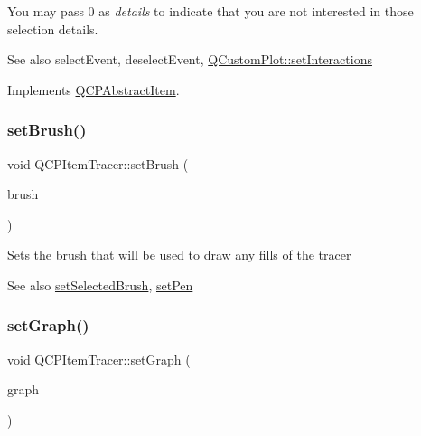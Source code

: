 You may pass 0 as {\itshape details} to indicate that you are not interested in those selection details.

\begin{DoxySeeAlso}{See also}
select\+Event, deselect\+Event, \hyperlink{class_q_custom_plot_a5ee1e2f6ae27419deca53e75907c27e5}{Q\+Custom\+Plot\+::set\+Interactions} 
\end{DoxySeeAlso}


Implements \hyperlink{class_q_c_p_abstract_item_a96d522d10ffc0413b9a366c6f7f0476b}{Q\+C\+P\+Abstract\+Item}.

\hypertarget{class_q_c_p_item_tracer_a2c303f7470a30084daa201ed556b3c36}{}\label{class_q_c_p_item_tracer_a2c303f7470a30084daa201ed556b3c36} 
\subsubsection{\texorpdfstring{set\+Brush()}{setBrush()}}
{\footnotesize\ttfamily void Q\+C\+P\+Item\+Tracer\+::set\+Brush (\begin{DoxyParamCaption}\item[{const Q\+Brush \&}]{brush }\end{DoxyParamCaption})}

Sets the brush that will be used to draw any fills of the tracer

\begin{DoxySeeAlso}{See also}
\hyperlink{class_q_c_p_item_tracer_a0f55c084980a7a312af859d3e7b558ef}{set\+Selected\+Brush}, \hyperlink{class_q_c_p_item_tracer_af8048636fc1ef0152e51809b008df2ca}{set\+Pen} 
\end{DoxySeeAlso}
\hypertarget{class_q_c_p_item_tracer_af5886f4ded8dd68cb4f3388f390790c0}{}\label{class_q_c_p_item_tracer_af5886f4ded8dd68cb4f3388f390790c0} 
\subsubsection{\texorpdfstring{set\+Graph()}{setGraph()}}
{\footnotesize\ttfamily void Q\+C\+P\+Item\+Tracer\+::set\+Graph (\begin{DoxyParamCaption}\item[{\hyperlink{class_q_c_p_graph}{Q\+C\+P\+Graph} $\ast$}]{graph }\end{DoxyParamCaption})}

